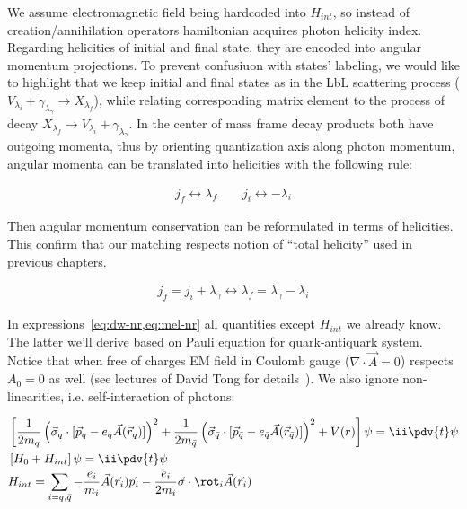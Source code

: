 We assume electromagnetic field being hardcoded into $H_{int}$, so instead of creation/annihilation operators hamiltonian acquires photon helicity index. Regarding helicities of initial and final state, they are encoded into angular momentum projections. To prevent confusiuon with states' labeling, we would like to highlight that we keep initial and final states as in the LbL scattering process ($V_{\lambda_i} + \gamma_{\lambda_\gamma} \rightarrow X_{\lambda_f}$), while relating corresponding matrix element to the process of decay $X_{\lambda_f} \rightarrow V_{\lambda_i} + \gamma_{\lambda_\gamma}$. In the center of mass frame decay products both have outgoing momenta, thus by orienting quantization axis along photon momentum, angular momenta can be translated into helicities with the following rule:

\begin{align}
    j_f \leftrightarrow \lambda_f \qquad j_i \leftrightarrow -\lambda_i
\end{align}

Then angular momentum conservation can be reformulated in terms of helicities. This confirm that our matching respects notion of ``total helicity'' used in previous chapters.

\begin{align}
    j_f = j_i + \lambda_\gamma \leftrightarrow \lambda_f = \lambda_\gamma - \lambda_i
\end{align}

In expressions~\cref{eq:dw-nr,eq:mel-nr} all quantities except $H_{int}$ we already know. The latter we'll derive based on Pauli equation for quark-antiquark system. Notice that when free of charges EM field in Coulomb gauge ($\nabla\cdot\vec{A} = 0$) respects $A_0 = 0$ as well (see lectures of David Tong for details~\cite{tong-qed}). We also ignore non-linearities, i.e. self-interaction of photons:

\begin{align}
    &\left[\frac{1}{2m_q} \left( \vec{\sigma}_q \cdot [\vec{p}_q - e_q \vec{A}(\vec{r}_q)] \right)^2 + \frac{1}{2m_{\bar{q}}} \left( \vec{\sigma}_{\bar{q}} \cdot [\vec{p}_{\bar{q}} - e_{\bar{q}} \vec{A}(\vec{r}_{\bar{q}})] \right)^2 + V(r) \right] \psi = \ii \pdv{t} \psi \\
    &\left[H_0 + H_{int} \right] \psi= \ii \pdv{t} \psi \\
    &H_{int} = \sum_{i = q, \bar{q}} -\frac{e_i}{m_i} \vec{A}(\vec{r}_i) \vec{p}_i - \frac{e_i}{2 m_i} \vec{\sigma} \cdot \rot_i \vec{A}(\vec{r}_i)
\end{align}


